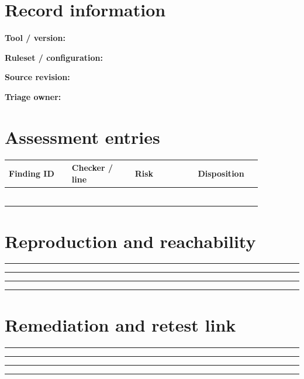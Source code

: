 \documentclass[10pt,letterpaper]{article}
\begin{document}
\makedoctitle
\makedocsummary
\section{Record information}
\noindent\textbf{Tool / version:}\quad\hrulefill\par\vspace{11pt}
\noindent\textbf{Ruleset / configuration:}\quad\hrulefill\par\vspace{11pt}
\noindent\textbf{Source revision:}\quad\hrulefill\par\vspace{11pt}
\noindent\textbf{Triage owner:}\quad\hrulefill\par\vspace{11pt}
\section{Assessment entries}
\begin{longtable}{|p{0.215\linewidth}|p{0.215\linewidth}|p{0.215\linewidth}|p{0.215\linewidth}|}
\hline
\textbf{Finding ID} & \textbf{Checker / line} & \textbf{Risk} & \textbf{Disposition}\\\hline
\endhead
\rule{0pt}{27pt} & & & \\\hline
\rule{0pt}{27pt} & & & \\\hline
\rule{0pt}{27pt} & & & \\\hline
\rule{0pt}{27pt} & & & \\\hline
\rule{0pt}{27pt} & & & \\\hline
\rule{0pt}{27pt} & & & \\\hline
\end{longtable}
\section{Reproduction and reachability}
\noindent\rule{\linewidth}{0.4pt}\par\vspace{16pt}
\noindent\rule{\linewidth}{0.4pt}\par\vspace{16pt}
\noindent\rule{\linewidth}{0.4pt}\par\vspace{16pt}
\noindent\rule{\linewidth}{0.4pt}\par\vspace{16pt}
\section{Remediation and retest link}
\noindent\rule{\linewidth}{0.4pt}\par\vspace{16pt}
\noindent\rule{\linewidth}{0.4pt}\par\vspace{16pt}
\noindent\rule{\linewidth}{0.4pt}\par\vspace{16pt}
\noindent\rule{\linewidth}{0.4pt}\par\vspace{16pt}
\end{document}
